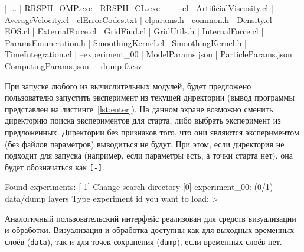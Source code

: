 \begin{ListingEnv}[!h]
    \captiondelim{ } %
    \caption{Файловая структура RRSPH}\label{lst:files}
    \begin{Verb}
    |   ...
    |   RRSPH_OMP.exe
    |   RRSPH_CL.exe
    |
    +---cl
    |       ArtificialViscosity.cl
    |       AverageVelocity.cl
    |       clErrorCodes.txt
    |       clparams.h
    |       common.h
    |       Density.cl
    |       EOS.cl
    |       ExternalForce.cl
    |       GridFind.cl
    |       GridUtils.h
    |       InternalForce.cl
    |       ParamsEnumeration.h
    |       SmoothingKernel.cl
    |       SmoothingKernel.h
    |       TimeIntegration.cl
    |   
    \---experiment_00
        |   ModelParams.json
        |   ParticleParams.json
        |   ComputingParams.json
        |   
        \---dump
                0.csv
    \end{Verb}
\end{ListingEnv}

При запуске любого из вычислительных модулей, 
будет предложено пользователю запустить эксперимент из текущей директории (вывод программы представлен на листинге~\ref{lst:enter}).
%
На данном экране возможно сменить директорию поиска экспериментов для старта, 
либо выбрать эксперимент из предложенных.
%
Директории без признаков того, что они являются экспериментом (без файлов параметров) выводиться не будут.
%
При этом, если директория не подходит для запуска (например, если параметры есть, а точки старта нет), 
она будет обозначаться как \verb|[-]|.

\begin{ListingEnv}[!h]
    \captiondelim{ } %
    \caption{Предложение о запуске расчёта}\label{lst:enter}
    \begin{Verb}
        Found experiments:
        [-1] Change search directory
        [0] experiment_00: (0/1) data/dump layers
        Type experiment id you want to load:
        >
    \end{Verb}
\end{ListingEnv}

Аналогичный пользовательский интерфейс реализован для средств визуализации и обработки. 
%
Визуализация и обработка доступны как для выходных временных слоёв (\verb|data|), 
так и для точек сохранения (\verb|dump|), если временных слоёв нет.

